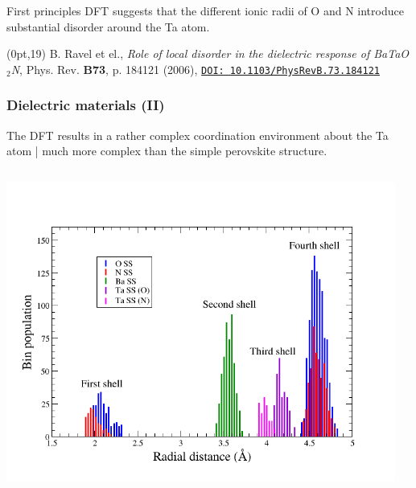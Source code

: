 \begin{frame}
  First principles DFT suggests that the different ionic radii of O
  and N introduce substantial disorder around the Ta atom.
  
  \begin{textblock*}{0.5\linewidth}(0pt,19\TPVertModule) 
    \tiny
    B. Ravel et el., \textit{Role of local disorder in the dielectric
      response of BaTaO$_2$N}, Phys. Rev. \textbf{B73}, p. 184121 (2006),
    \href{http://dx.doi.org/10.1103/PhysRevB.73.184121}
    {\color{Blue4}\texttt{DOI: 10.1103/PhysRevB.73.184121}}
  \end{textblock*}
\end{frame}

\begin{frame}
  \frametitle{Dielectric materials (II)}%
  The DFT results in a rather complex coordination environment about
  the Ta atom | much more complex than the simple perovskite
  structure.
  \begin{columns}
    \begin{column}{0.5\linewidth}
      \begin{center}
        \includegraphics[width=\linewidth]{xas/bton_SS.png}
      \end{center}
    \end{column}
    \begin{column}{0.5\linewidth}
      \begin{center}

\end{center}
\end{column}
\end{columns}
\end{frame}
